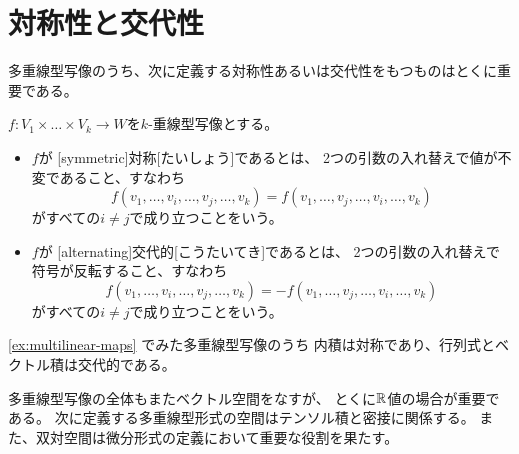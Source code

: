 \documentclass[report]{jlreq}
\begin{document}
%
\section{対称性と交代性}

多重線型写像のうち、次に定義する対称性あるいは交代性をもつものはとくに重要である。

\begin{definition}[対称性と交代性]
    $f \colon V_1 \times \dots \times V_k \to W$を$k$-重線型写像とする。
    \begin{itemize}
        \item $f$が
            [symmetric]{対称}[たいしょう]であるとは、
            2つの引数の入れ替えで値が不変であること、すなわち
            \begin{equation}
                f(v_1, \dots, v_i, \dots, v_j, \dots, v_k)
                    = f(v_1, \dots, v_j, \dots, v_i, \dots, v_k)
            \end{equation}
            がすべての$i \neq j$で成り立つことをいう。
        \item $f$が
            [alternating]{交代的}[こうたいてき]であるとは、
            2つの引数の入れ替えで符号が反転すること、すなわち
            \begin{equation}
                f(v_1, \dots, v_i, \dots, v_j, \dots, v_k)
                    = -f(v_1, \dots, v_j, \dots, v_i, \dots, v_k)
            \end{equation}
            がすべての$i \neq j$で成り立つことをいう。
    \end{itemize}
\end{definition}

\begin{example}[対称性と交代性の例]
    \cref{ex:multilinear-maps} でみた多重線型写像のうち
    内積は対称であり、行列式とベクトル積は交代的である。
\end{example}

多重線型写像の全体もまたベクトル空間をなすが、
とくに$\mathbb{R}$値の場合が重要である。
次に定義する多重線型形式の空間はテンソル積と密接に関係する。
また、双対空間は微分形式の定義において重要な役割を果たす。
\end{document}
